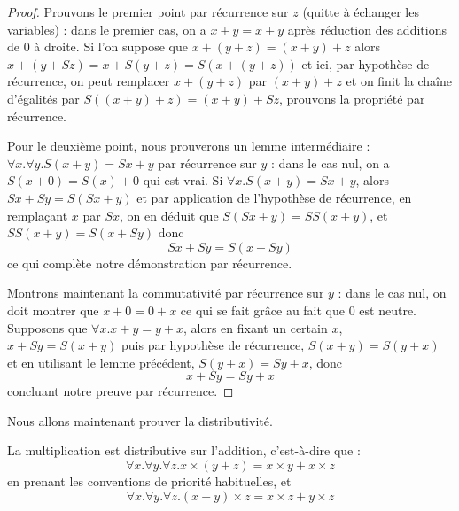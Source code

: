 \begin{proof}
    Prouvons le premier point par récurrence sur $z$ (quitte à échanger les variables) : dans le premier cas, on a $x+y=x+y$ après réduction des additions de $0$ à droite. Si l'on suppose que $x+(y+z)=(x+y)+z$ alors $x+(y+S z) = x+S(y+z)=S(x+(y+z))$ et ici, par hypothèse de récurrence, on peut remplacer $x+(y+z)$ par $(x+y)+z$ et on finit la chaîne d'égalités par $S((x+y)+z) = (x+y) + Sz$, prouvons la propriété par récurrence.

    Pour le deuxième point, nous prouverons un lemme intermédiaire : $\forall x.\forall y. S(x+y)=Sx+y$ par récurrence sur $y$ : dans le cas nul, on a $S(x+0) = S(x) + 0$ qui est vrai. Si $\forall x.S(x+y)=Sx+y$, alors $Sx+Sy = S(Sx+y)$ et par application de l'hypothèse de récurrence, en remplaçant $x$ par $Sx$, on en déduit que $S(Sx+y) = SS(x+y)$, et $SS(x+y) = S(x+Sy)$ donc $$Sx+Sy=S(x+Sy)$$ ce qui complète notre démonstration par récurrence.

    Montrons maintenant la commutativité par récurrence sur $y$ : dans le cas nul, on doit montrer que $x+0=0+x$ ce qui se fait grâce au fait que $0$ est neutre. Supposons que $\forall x. x+y=y+x$, alors en fixant un certain $x$, $x+Sy=S(x+y)$ puis par hypothèse de récurrence, $S(x+y)=S(y+x)$ et en utilisant le lemme précédent, $S(y+x)=Sy+x$, donc $$x+Sy=Sy+x$$ concluant notre preuve par récurrence.
\end{proof}

Nous allons maintenant prouver la distributivité.

\begin{prop}[Distributivité]
    La multiplication est distributive sur l'addition, c'est-à-dire que : $$\forall x.\forall y.\forall z.x\times(y+z) = x\times y + x\times z$$ en prenant les conventions de priorité habituelles, et $$\forall x.\forall y.\forall z. (x+y)\times z = x\times z + y\times z$$
\end{prop}

